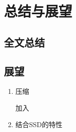 \chapter{总结与展望}
\label{cha:conclusions}

\section{全文总结}
\label{sec:thesis_conclusion}

\section{展望}
\label{sec:thesis_expectation}

\begin{enumerate}

\item 压缩

加入

\item 结合SSD的特性

\end{enumerate}

